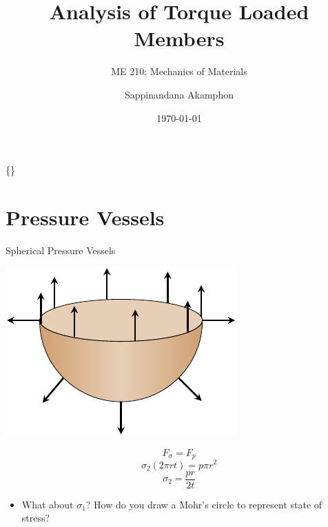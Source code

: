 \documentclass[10pt, svgnames]{beamer}
\author{Sappinandana Akamphon}
\date{\today}
\title{Analysis of Torque Loaded Members}
\subtitle{ME 210: Mechanics of Materials}
\institute{Department of Mechanical Engineering, TSE}
\date{}
\begin{document}
\begin{frame}[label={sec:org818fbc7}]{\{\}}
\maketitle
\end{frame}

\section{Pressure Vessels}
\label{sec:org6fb79e1}

\begin{frame}[label={sec:orgdd4ef5a}]{Spherical Pressure Vessels}
\begin{center}
\includegraphics[width=.9\linewidth]{pictures/sphere-pressure-vessel.pdf}
\end{center}

$$ F_{\sigma} = F_p $$
$$ \sigma_2 \left( 2\pi r t \right) = p \pi r^2 $$
$$ \sigma_2 = \frac{pr}{2t} $$

\begin{itemize}
\item What about \(\sigma_1\)? How do you draw a Mohr's circle to represent state of stress?
\end{itemize}
\end{frame}
\end{document}
